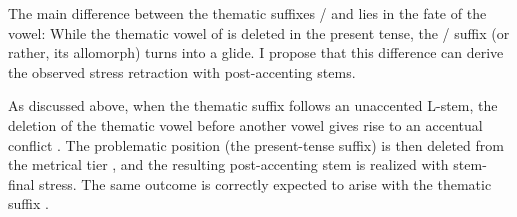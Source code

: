 \documentclass[output=paper,colorlinks,citecolor=black,koreanfont]{langscibook}
\begin{document}
The main difference between the thematic suffixes / and  lies in the fate of the vowel: While the thematic vowel of  is deleted in the present tense, the / suffix (or rather, its  allomorph) turns into a glide. I propose that this difference can derive the observed stress retraction with post-accenting stems.

As discussed above, when the thematic suffix  follows an unaccented L-stem, the deletion of the thematic vowel before another vowel gives rise to an accentual conflict . The problematic position (the present-tense suffix) is then deleted from the metrical tier , and the resulting  post-accenting stem is realized with stem-final stress. The same outcome is correctly expected  to arise with the thematic suffix  .

\newpage\vspace*{1em}
\end{document}
